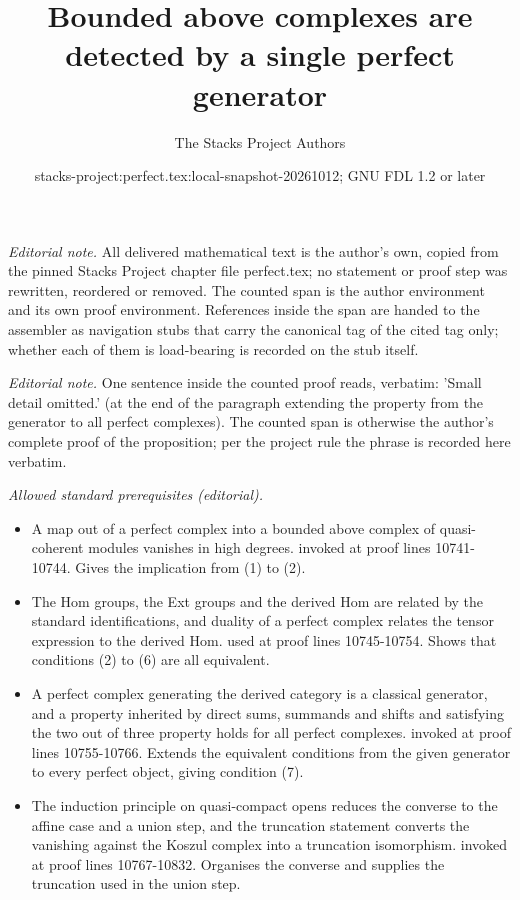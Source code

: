 \documentclass{stacks-project}
\title{Bounded above complexes are detected by a single perfect generator}
\author{The Stacks Project Authors}
\date{stacks-project:perfect.tex:local-snapshot-20261012; GNU FDL 1.2 or later}
\theoremstyle{plain}
\theoremstyle{definition}
\theoremstyle{remark}
\numberwithin{equation}{subsection}
\begin{document}
\maketitle
\setcounter{subsection}{1}
\noindent\textit{Editorial note.} All delivered mathematical text is the author's own, copied from the pinned Stacks Project chapter file perfect.tex; no statement or proof step was rewritten, reordered or removed. The counted span is the author environment and its own proof environment. References inside the span are handed to the assembler as navigation stubs that carry the canonical tag of the cited tag only; whether each of them is load-bearing is recorded on the stub itself.\par\medskip
\noindent\textit{Editorial note.} One sentence inside the counted proof reads, verbatim: 'Small detail omitted.' (at the end of the paragraph extending the property from the generator to all perfect complexes). The counted span is otherwise the author's complete proof of the proposition; per the project rule the phrase is recorded here verbatim.\par\medskip
\noindent\textit{Allowed standard prerequisites (editorial).}\begin{itemize}
\item A map out of a perfect complex into a bounded above complex of quasi-coherent modules vanishes in high degrees. invoked at proof lines 10741-10744. Gives the implication from (1) to (2).
\item The Hom groups, the Ext groups and the derived Hom are related by the standard identifications, and duality of a perfect complex relates the tensor expression to the derived Hom. used at proof lines 10745-10754. Shows that conditions (2) to (6) are all equivalent.
\item A perfect complex generating the derived category is a classical generator, and a property inherited by direct sums, summands and shifts and satisfying the two out of three property holds for all perfect complexes. invoked at proof lines 10755-10766. Extends the equivalent conditions from the given generator to every perfect object, giving condition (7).
\item The induction principle on quasi-compact opens reduces the converse to the affine case and a union step, and the truncation statement converts the vanishing against the Koszul complex into a truncation isomorphism. invoked at proof lines 10767-10832. Organises the converse and supplies the truncation used in the union step.
\end{itemize}\medskip
\end{document}
